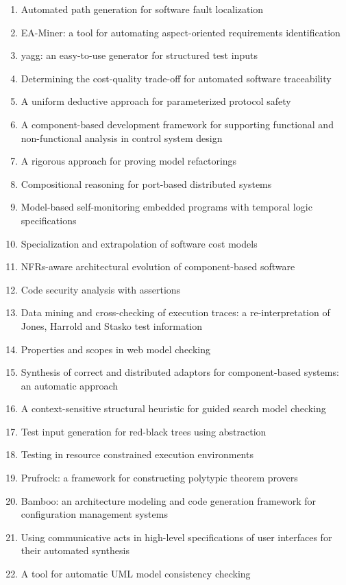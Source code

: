 \begin{enumerate}[itemsep=-1ex]
  \item Automated path generation for software fault localization
  \item EA-Miner: a tool for automating aspect-oriented requirements identification
  \item yagg: an easy-to-use generator for structured test inputs
  \item Determining the cost-quality trade-off for automated software traceability
  \item A uniform deductive approach for parameterized protocol safety
  \item A component-based development framework for supporting functional and non-functional analysis in control system design
  \item A rigorous approach for proving model refactorings
  \item Compositional reasoning for port-based distributed systems
  \item Model-based self-monitoring embedded programs with temporal logic specifications
  \item Specialization and extrapolation of software cost models
  \item NFRs-aware architectural evolution of component-based software
  \item Code security analysis with assertions
  \item Data mining and cross-checking of execution traces: a re-interpretation of Jones, Harrold and Stasko test information
  \item Properties and scopes in web model checking
  \item Synthesis of correct and distributed adaptors for component-based systems: an automatic approach
  \item A context-sensitive structural heuristic for guided search model checking
  \item Test input generation for red-black trees using abstraction
  \item Testing in resource constrained execution environments
  \item Prufrock: a framework for constructing polytypic theorem provers
  \item Bamboo: an architecture modeling and code generation framework for configuration management systems
  \item Using communicative acts in high-level specifications of user interfaces for their automated synthesis
  \item A tool for automatic UML model consistency checking

\end{enumerate}
